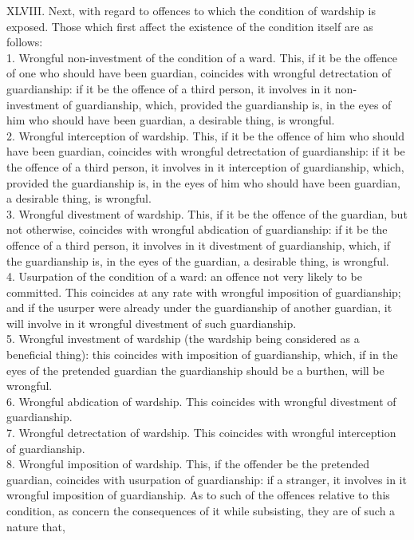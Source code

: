 \documentclass[12pt]{report}
\begin{document}
XLVIII. Next, with regard to offences to which the condition of wardship
is exposed. Those which first affect the existence of the condition
itself are as follows:\\
1. Wrongful non-investment of the condition of a ward. This, if it be
the offence of one who should have been guardian, coincides with
wrongful detrectation of guardianship: if it be the offence of a third
person, it involves in it non-investment of guardianship, which,
provided the guardianship is, in the eyes of him who should have been
guardian, a desirable thing, is wrongful.\\
2. Wrongful interception of wardship. This, if it be the offence of him
who should have been guardian, coincides with wrongful detrectation of
guardianship: if it be the offence of a third person, it involves in it
interception of guardianship, which, provided the guardianship is, in
the eyes of him who should have been guardian, a desirable thing, is
wrongful.\\
3. Wrongful divestment of wardship. This, if it be the offence of the
guardian, but not otherwise, coincides with wrongful abdication of
guardianship: if it be the offence of a third person, it involves in it
divestment of guardianship, which, if the guardianship is, in the eyes
of the guardian, a desirable thing, is wrongful.\\
4. Usurpation of the condition of a ward: an offence not very likely to
be committed. This coincides at any rate with wrongful imposition of
guardianship; and if the usurper were already under the guardianship of
another guardian, it will involve in it wrongful divestment of such
guardianship.\\
5. Wrongful investment of wardship (the wardship being considered as a
beneficial thing): this coincides with imposition of guardianship,
which, if in the eyes of the pretended guardian the guardianship should
be a burthen, will be wrongful.\\
6. Wrongful abdication of wardship. This coincides with wrongful
divestment of guardianship.\\
7. Wrongful detrectation of wardship. This coincides with wrongful
interception of guardianship.\\
8. Wrongful imposition of wardship. This, if the offender be the
pretended guardian, coincides with usurpation of guardianship: if a
stranger, it involves in it wrongful imposition of guardianship. As to
such of the offences relative to this condition, as concern the
consequences of it while subsisting, they are of such a nature that,
\end{document}
